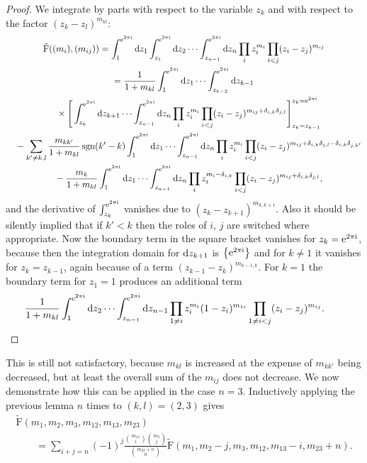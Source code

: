 \documentclass[pdftex]{sigma}%
\numberwithin{equation}{section}
\renewcommand{\i}{\mathrm{i}}
\renewcommand{\d}{\mathrm{d}}
\newcommand{\rFp}{\tilde{\mathrm{F}}}
\begin{document}
\begin{proof}We integrate by parts with respect to the variable $z_k$ and with
respect to the factor $(z_k-z_l)^{m_{kl}}$:
\begin{gather*}
\rFp((m_i),(m_{ij}))
=\int_1^{{\rm e}^{2\pi\i }}\d z_1 \int_{z_1}^{{\rm e}^{2\pi\i }}\d z_2\cdots\int_{z_{n-1}}^{{\rm e}^{2\pi\i }}\d z_n\prod_i
z_i^{m_i}\prod_{i<j}(z_i - z_j)^{m_{ij}}\\
=\frac{1}{1+m_{kl}}\int_1^{{\rm e}^{2\pi\i }}\d z_1\cdots 
\int_{z_{k-2}}^{{\rm e}^{2\pi\i }}\d z_{k-1}\\
\quad {} \times\Bigg[\int_{z_k}^{{\rm e}^{2\pi\i }}\d z_{k+1}\cdots\int_{z_{n-1}}^{{\rm e}^{2\pi\i }}\d z_n \prod_i
z_i^{m_i}\prod_{i<j}(z_i - z_j)^{m_{ij}+\delta_{i,k}\delta_{j,l}}\Bigg]_{z_k=z_{k-1}}^{z_k={\rm e}^{2\pi\i }}\\
\quad{} -\sum_{k'\neq k,l} \frac{m_{kk'}}{1+m_{kl}}\operatorname{sgn}(k'-k)
\int_1^{{\rm e}^{2\pi\i }}\d z_1 \cdots \int_{z_{n-1}}^{{\rm e}^{2\pi\i }}\d z_n \prod_i
z_i^{m_i}\prod_{i<j}(z_i -z_j)^{m_{ij}+\delta_{i,k}\delta_{j,l}-\delta_{i,k}\delta_{j,k'}} \\
\quad{}-\frac{m_{k}}{1+m_{kl}}\int_1^{{\rm e}^{2\pi\i }}\d z_1\cdots
\int_{z_{n-1}}^{{\rm e}^{2\pi\i }}\d z_n \prod_i z_i^{m_i-\delta_{i,k}}\prod_{i<j}(z_i -z_j)^{m_{ij}+\delta_{i,k}\delta_{j,l}},
\end{gather*}
and the derivative of $\int_{z_k}^{{\rm e}^{2\pi\i}}$ vanishes due to $(z_k-z_{k+1})^{m_{k,k+1}}$. Also it should be silently implied that if $k'<k$ then the roles of $i$, $j$ are switched where appropriate. Now the boundary term in the square bracket vanishes for $z_k={\rm e}^{2\pi\i}$, because then the integration domain for ${\rm d}z_{k+1}$ is $\big\{{\rm e}^{2\pi\i }\big\}$ and for $k\neq 1$ it vanishes for $z_k=z_{k-1}$, again because of a term $(z_{k-1}-z_k)^{m_{k-1,k}}$. For $k=1$ the boundary term for $z_1=1$ produces an additional term
\[
\frac{1}{1+m_{kl}}\int_1^{{\rm e}^{2\pi\i }}\d z_2\cdots \int_{z_{n-1}}^{{\rm e}^{2\pi\i }}\d z_{n-1} \prod_{1\neq i}
z_i^{m_i}(1-z_i)^{m_{1i}}\prod_{1\neq i<j}(z_i - z_j)^{m_{ij}}.\tag*{\qed}
\]\renewcommand{\qed}{}
\end{proof}

This is still not satisfactory, because $m_{kl}$ is increased at the
expense of $m_{kk'}$ being decreased, but at least the overall sum of
the $m_{ij}$ does not decrease. We now demonstrate how this can be
applied in the case $n=3$. Inductively applying the previous lemma $n$
times to $(k,l)=(2,3)$ gives
\begin{gather*}
\rFp(m_1,m_2,m_3,m_{12},m_{13},m_{23})\\
\qquad =\sum_{i+j=n}(-1)^j\frac{{m_{13} \choose i}{m_{3} \choose j}}{{m_{23}+n
\choose n}}\rFp(m_1,m_2-j,m_3,m_{12},m_{13}-i,m_{23}+n).
\end{gather*}
\end{document}

